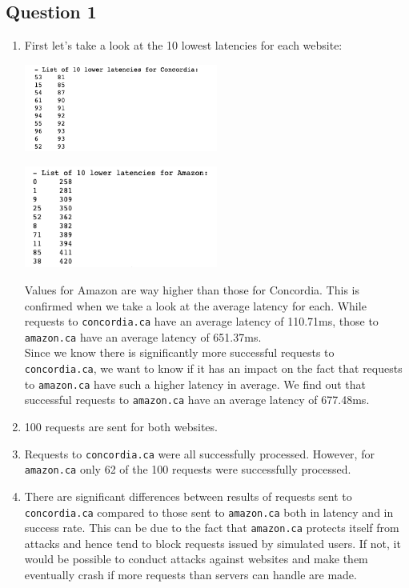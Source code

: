 \newpage
\subsection*{Question 1}

\begin{enumerate}[label={\alph*)}]
    \item First let's take a look at the 10 lowest latencies for each website:
    
    \begin{center}
        \includegraphics[width=0.5\textwidth]{img/img1.png}
    \end{center}
    \begin{center}
        \includegraphics[width=0.5\textwidth]{img/img2.png}
    \end{center}
    
    \noindent Values for Amazon are way higher than those for Concordia. This is confirmed when we take a look at the average latency for each. While requests to \verb|concordia.ca| have an average latency of 110.71ms, those to \verb|amazon.ca| have an average latency of 651.37ms.\\ Since we know there is significantly more successful requests to \verb|concordia.ca|, we want to know if it has an impact on the fact that requests to \verb|amazon.ca| have such a higher latency in average. We find out that successful requests to \verb|amazon.ca| have an average latency of 677.48ms.
    
    \item 100 requests are sent for both websites.
    
    \item Requests to \verb|concordia.ca| were all successfully processed. However, for \verb|amazon.ca| only 62 of the 100 requests were successfully processed. 
    
    \item There are significant differences between results of requests sent to \verb|concordia.ca| compared to those sent to \verb|amazon.ca| both in latency and in success rate. This can be due to the fact that \verb|amazon.ca| protects itself from attacks and hence tend to block requests issued by simulated users. If not, it would be possible to conduct attacks against websites and make them eventually crash if more requests than servers can handle are made. 
\end{enumerate}
